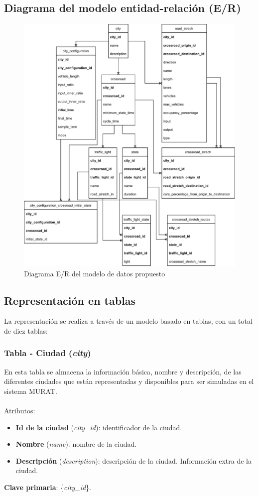 \newpage
\subsection{Diagrama del modelo entidad-relación (E/R)}
\begin{figure}[H]
    \centering
    \includegraphics[width=1\linewidth]{text/image/DE_R.pdf}
    \caption{Diagrama E/R del modelo de datos propuesto}
    \label{fig:de_r}
\end{figure}

\newpage
\subsection{Representación en tablas}
La representación se realiza a través de un modelo basado en tablas, con un total de diez tablas:

\subsubsection{Tabla - Ciudad (\textit{city})}
En esta tabla se almacena la información básica, nombre y descripción, de las diferentes ciudades que están representadas y disponibles para ser simuladas en el sistema MURAT. \\\\
Atributos:
\begin{itemize}
    \item \textbf{Id de la ciudad} (\textit{city\_id}): identificador de la ciudad.
    \item \textbf{Nombre} (\textit{name}): nombre de la ciudad.
    \item \textbf{Descripción} (\textit{description}): descripción de la ciudad. Información extra de la ciudad.
\end{itemize}
\textbf{Clave primaria}: \{\textit{city\_id}\}. \\

